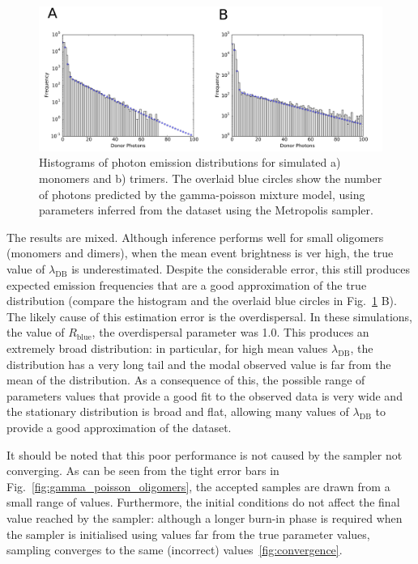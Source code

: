 \begin{figure}
   \begin{center}
      \includegraphics*[clip=true, width=6in]{sizing/oligomer_marginals.pdf}
      \caption{Histograms of photon emission distributions for simulated a) monomers and b) trimers. The overlaid blue circles show the  number of photons predicted by the gamma-poisson mixture model, using parameters inferred from the dataset using the Metropolis sampler.}
      \label{fig:hist_fit}
   \end{center}
\end{figure}

The results are mixed. Although inference performs well for small oligomers (monomers and dimers), when the mean event brightness is ver high, the true value of $\lambda_{\text{DB}}$ is underestimated. Despite the considerable error, this still produces expected emission frequencies that are a good approximation of the true distribution (compare the histogram and the overlaid blue circles in Fig.~\ref{fig:hist_fit} B). The likely cause of this estimation error is the overdispersal. In these simulations, the value of $R_{\text{blue}}$, the overdispersal parameter was 1.0. This produces an extremely broad distribution: in particular, for high mean values $\lambda_{\text{DB}}$, the distribution has a very long tail and the modal observed value is far from the mean of the distribution. As a consequence of this, the possible range of parameters values that provide a good fit to the observed data is very wide and the stationary distribution is broad and flat, allowing many values of $\lambda_{\text{DB}}$ to provide a good approximation of the dataset.

It should be noted that this poor performance is not caused by the sampler not converging. As can be seen from the tight error bars in Fig.~\ref{fig:gamma_poisson_oligomers}, the accepted samples are drawn from a small range of values. Furthermore, the initial conditions do not affect the final value reached by the sampler: although a longer burn-in phase is required when the sampler is initialised using values far from the true parameter values, sampling converges to the same (incorrect) values~\ref{fig:convergence}.

